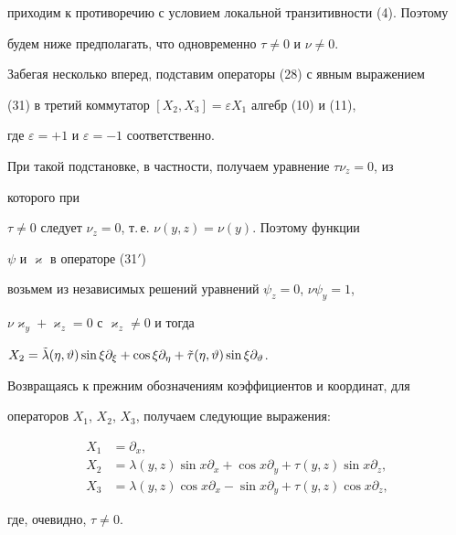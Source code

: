 приходим к противоречию с условием локальной транзитивности (4). Поэтому 


будем ниже предполагать, что одновременно $\tau\ne 0$ и $\nu\ne 0$. 


 


Забегая несколько вперед, подставим операторы (28) с явным выражением 


(31) в третий коммутатор $[X_2,X_3]=\varepsilon X_1$ алгебр (10) и (11), 


где $\varepsilon=+1$ и $\varepsilon=-1$ соответственно. 


При такой подстановке, в частности, получаем уравнение $\tau\nu_z=0$, из 


которого при 


$\tau\ne 0$ следует $\nu_z=0$, т.\,е. $\nu(y,z)=\nu(y)$. Поэтому функции 


$\psi$ и $\varkappa$ в операторе (31${}'$) 


возьмем из независимых решений уравнений $\psi_z=0$, $\nu\psi_y=1$, 


$\nu\varkappa_y+\varkappa_z=0$ с $\varkappa_z\ne 0$ и тогда 


$X_2=\Tilde\lambda(\eta,\vartheta)\sin\xi\partial_\xi+ 


\cos\xi\partial_\eta+\Tilde\tau(\eta,\vartheta)\sin\xi\partial_\vartheta$. 


Возвращаясь к прежним обозначениям коэффициентов и координат, для 


операторов $X_1$, $X_2$, $X_3$, получаем следующие выражения: 


\begin{equation} 


\begin{split} 


X_1&=\partial_x,\\ 


X_2&=\lambda(y,z)\sin x\partial_x+\cos x\partial_y+ 


\tau(y,z)\sin x\partial_z,\\ 


X_3&=\lambda(y,z)\cos x\partial_x-\sin x\partial_y+ 


\tau(y,z)\cos x\partial_z, 


\end{split} 


\end{equation} 


где, очевидно, $\tau\ne 0$. 


